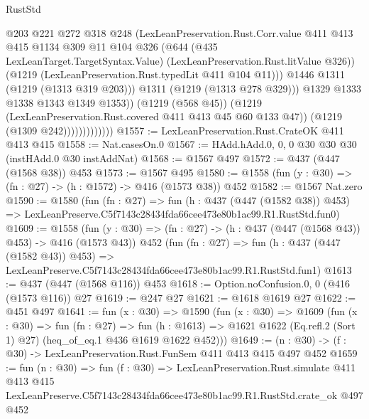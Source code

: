 \begin{lexlean}{RustStd}
\begin{coremodule}
                                  @203
                                  @221
                                  @272
                                  @318
                                  @248
                                  (LexLeanPreservation.Rust.Corr.value
                                    @411
                                    @413
                                    @415
                                    @1134
                                    @309
                                    @11
                                    @104
                                    @326
                                    (@644
                                      (@435 LexLeanTarget.TargetSyntax.Value)
                                      (LexLeanPreservation.Rust.litValue @326))
                                    (@1219 (LexLeanPreservation.Rust.typedLit @411 @104 @11)))
                                  @1446
                                  @1311
                                  (@1219 (@1313 @319 @203)))
                                @1311
                                (@1219 (@1313 @278 @329)))
                              @1329
                              @1333
                              @1338
                              @1343
                              @1349
                              @1353))
                          (@1219 (@568 @45))
                          (@1219 (LexLeanPreservation.Rust.covered @411 @413 @45 @60 @133 @47))
                          (@1219 (@1309 @242)))))))))))))
@1557 := LexLeanPreservation.Rust.CrateOK @411 @413 @415
@1558 := Nat.casesOn.{0}
@1567 := HAdd.hAdd.{0, 0, 0} @30 @30 @30 (instHAdd.{0} @30 instAddNat)
@1568 := @1567 @497
@1572 := @437 (@447 (@1568 @38)) @453
@1573 := @1567 @495
@1580 := @1558 (fun (y : @30) => (fn : @27) -> (h : @1572) -> @416 (@1573 @38)) @452
@1582 := @1567 Nat.zero
@1590 := @1580
    (fun (fn : @27) =>
    fun (h : @437 (@447 (@1582 @38)) @453) =>
    LexLeanPreserve.C5f7143c28434fda66cee473e80b1ac99.R1.RustStd.fun0)
@1609 := @1558
    (fun (y : @30) => (fn : @27) -> (h : @437 (@447 (@1568 @43)) @453) -> @416 (@1573 @43))
    @452
    (fun (fn : @27) =>
    fun (h : @437 (@447 (@1582 @43)) @453) =>
    LexLeanPreserve.C5f7143c28434fda66cee473e80b1ac99.R1.RustStd.fun1)
@1613 := @437 (@447 (@1568 @116)) @453
@1618 := Option.noConfusion.{0, 0} (@416 (@1573 @116)) @27
@1619 := @247 @27
@1621 := @1618 @1619 @27
@1622 := @451 @497
@1641 := fun (x : @30) =>
  @1590
    (fun (x : @30) =>
    @1609
      (fun (x : @30) =>
      fun (fn : @27) =>
      fun (h : @1613) =>
      @1621 @1622 (Eq.refl.{2} (Sort 1) @27) (heq_of_eq.{1} @436 @1619 @1622 @452)))
@1649 := (n : @30) -> (f : @30) -> LexLeanPreservation.Rust.FunSem @411 @413 @415 @497 @452
@1659 := fun (n : @30) =>
  fun (f : @30) =>
  LexLeanPreservation.Rust.simulate
    @411
    @413
    @415
    LexLeanPreserve.C5f7143c28434fda66cee473e80b1ac99.R1.RustStd.crate_ok
    @497
    @452
\end{coremodule}
\end{lexlean}
